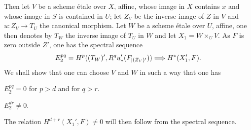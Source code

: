 Then let $V$ be a scheme \'etale over $X$, affine, whose image in $X$ contains $x$ and whose image in $S$ is contained in $U$; let $Z_V$ be the inverse image of $Z$ in $V$ and $u: Z_V \to T_U$ the canonical morphism. Let $W$ be a scheme \'etale over $U$, affine, one then denotes by $T_W$ the inverse image of $T_U$ in $W$ and let $X_1 = W\times_U V$. As $F$ is zero outside $Z'$, one has the spectral sequence
$$
E^{pq}_2 = H^p((T_W)', R^qu_*'(F_{|(Z_V)'})) \To H^*(X'_1, F).
$$
We shall show that one can choose $V$ and $W$ in such a way that one has
\begin{enumeratea}
\item
$E^{pq}_2=0$ for $p>d$ and for $q>r$.
\item
$E^{dr}_2 \neq 0$.
\end{enumeratea}
\noindent
The relation $H^{d+r}(X_1', F) \neq 0$ will then follow from the spectral sequence.

